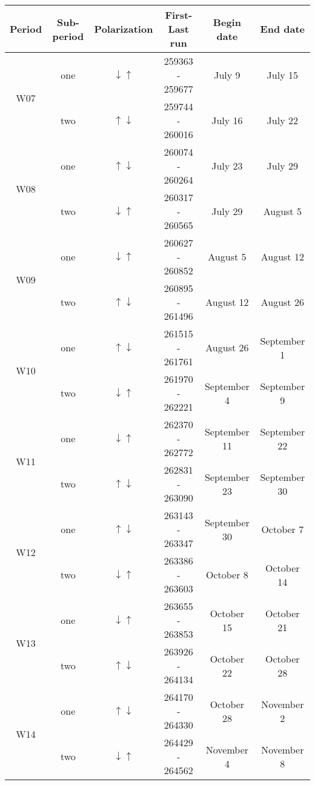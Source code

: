 \begin{table}[h!]
  \centering
    \begin{tabular}{ |c|c|c|c|c|c| }
      \hline
      Period&  Sub-period&  Polarization&  First-Last run&  Begin date&  End date \\
      \hline
      
      \multirow{2}{2em}{W07}&  one&  $\downarrow \uparrow$&  259363 - 259677&  July 9&  July 15 \\
      & two&  $\uparrow \downarrow$&  259744 - 260016&  July 16&  July 22 \\
      \hline

      \multirow{2}{2em}{W08}&  one&  $\uparrow \downarrow$&  260074 - 260264&  July 23&  July 29 \\
      & two&  $\downarrow \uparrow$&  260317 - 260565&  July 29&  August 5 \\
      \hline

      \multirow{2}{2em}{W09}&  one&  $\downarrow \uparrow$&  260627 - 260852&  August 5&  August 12 \\
      & two&  $\uparrow \downarrow$&  260895 - 261496&  August 12&  August 26 \\
      \hline

      \multirow{2}{2em}{W10}&  one&  $\uparrow \downarrow$&  261515 - 261761&  August 26&  September 1 \\
      & two&  $\downarrow \uparrow$&  261970 - 262221&  September 4&  September 9 \\
      \hline

      \multirow{2}{2em}{W11}&  one&  $\downarrow \uparrow$&  262370 - 262772&  September 11&  September 22 \\
      & two&  $\uparrow \downarrow$&  262831 - 263090&  September 23&  September 30 \\
      \hline

      \multirow{2}{2em}{W12}&  one&  $\uparrow \downarrow$&  263143 - 263347&  September 30&  October 7 \\
      & two&  $\downarrow \uparrow$&  263386 - 263603&  October 8&  October 14 \\
      \hline

      \multirow{2}{2em}{W13}&  one&  $\downarrow \uparrow$&  263655 - 263853&  October 15&  October 21 \\
      & two&  $\uparrow \downarrow$&  263926 - 264134&  October 22&  October 28 \\
      \hline

      \multirow{2}{2em}{W14}&  one&  $\uparrow \downarrow$&  264170 - 264330&  October 28&  November 2 \\
      & two&  $\downarrow \uparrow$&  264429 - 264562&  November 4&  November 8 \\
      \hline


\end{tabular}
\end{table}
